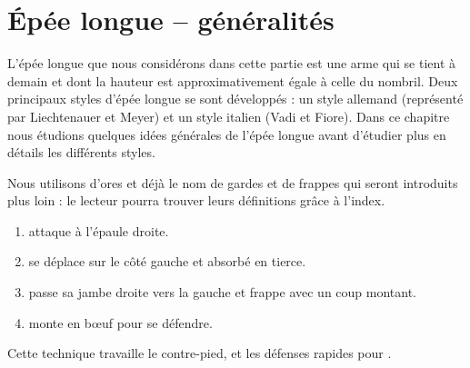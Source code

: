 \chapter{Épée longue -- généralités}


L'épée longue que nous considérons dans cette partie est une arme qui se tient à demain et dont la hauteur est approximativement égale à celle du nombril.
Deux principaux styles d'épée longue se sont développés : un style allemand (représenté par Liechtenauer et Meyer) et un style italien (Vadi et Fiore).
Dans ce chapitre nous étudions quelques idées générales de l'épée longue avant d'étudier plus en détails les différents styles.

Nous utilisons d'ores et déjà le nom de gardes et de frappes qui seront introduits plus loin : le lecteur pourra trouver leurs définitions grâce à l'index.

\begin{technique}

\begin{enumerate}
	\item \A attaque à l'épaule droite.
	
	\item \D se déplace sur le côté gauche et absorbé en tierce.
	
	\item \D passe sa jambe droite vers la gauche et frappe \A avec un coup montant.
	
	\item \A monte en bœuf pour se défendre.
\end{enumerate}

Cette technique travaille le contre-pied, et les défenses rapides pour \A.

\end{technique}


